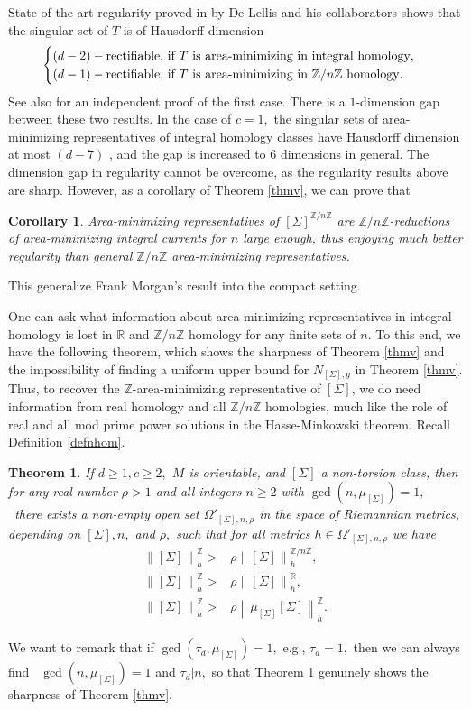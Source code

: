 \documentclass[11pt,a4paper]{amsart}
\numberwithin{equation}{section}
\newcommand{\Om}{\Omega}
\newcommand{\Si}{\Sigma}
\newcommand{\rh}{\rho}
\newcommand{\no}[1]{\left\lVert#1\right\rVert}
\newcommand{\R}{\mathbb{R}}
\newcommand{\Z}{\mathbb{Z}}
\theoremstyle{plain}
\newtheorem{thm}{Theorem}
\newtheorem{cor}{Corollary}[subsection]
\theoremstyle{definition}
\numberwithin{equation}{subsection}
\begin{document}
	State of the art regularity proved in \cite{LScy,DMS1,DMS2,DMS3,DMSmodq} by De Lellis and his collaborators  shows that the singular set of $T$ is of Hausdorff dimension
	\begin{align*}
		\begin{cases}
			(d-2)-\textnormal{rectifiable, if }T\textnormal{ is area-minimizing in integral homology},\\
			(d-1)-\textnormal{rectifiable, if }T\textnormal{ is area-minimizing in }\Z/n\Z \textnormal{ homology}.
		\end{cases}
	\end{align*}See also \cite{BK1,BK2,BK3} for an independent proof of the first case.
	There is a $1$-dimension gap between these two results. In the case of $c=1,$ the singular sets of area-minimizing representatives of integral homology classes have Hausdorff dimension at most $(d-7)$ \cite{NV}, and the gap is increased to $6$ dimensions in general. The dimension gap in regularity cannot be overcome, as the regularity results above are sharp. However, as a corollary of Theorem \ref{thmv}, we can prove that
	\begin{cor}\label{coras}
		Area-minimizing representatives of $[\Si]^{\Z/n\Z}$ are $\Z/n\Z$-reductions of area-minimizing integral currents for $n$ large enough, thus enjoying much better regularity than general $\Z/n\Z$ area-minimizing representatives.
	\end{cor}
This  generalize Frank Morgan's result \cite{FMmmn} into the compact setting. 

	One can ask what information about area-minimizing representatives in integral homology is lost in $\R$ and $\Z/n\Z$ homology for any finite sets of $n$. To this end, we have the following theorem, which shows the sharpness of Theorem \ref{thmv} and the impossibility of finding a uniform upper bound for $N_{[\Si],g}$ in Theorem \ref{thmv}. Thus, to recover the $\Z$-area-minimizing representative of $[\Si]$, we do need information from real homology and all $\Z/n\Z$ homologies, much like the role of real and all mod prime power solutions in the Hasse-Minkowski theorem. Recall Definition \ref{defnhom}.
	\begin{thm}\label{thmvn}
		If $d\ge 1,c\ge 2,$ $M$ is orientable, and $[\Si]$ a non-torsion class, then for any real number $\rh>1$ and all integers $n\ge 2$ with $\operatorname{gcd}\left(n,\mu_{[\Si]}\right)=1,$  there exists a non-empty open set $\Om'_{[\Si],n,\rh}$ in the space of Riemannian metrics, depending on $[\Si],n,$ and $\rh,$ such that for all metrics $h\in\Om'_{[\Si],n,\rh}$ we have
		\begin{align}
			\label{eqzv}	{\no{[\Si]}^{\Z}_h}>& \rh{\no{[\Si]}^{\Z/n\Z}_h},\\
			\label{eqzr}	{\no{[\Si]}^{\Z}_h}>&\rh{\no{[\Si]}^{\R}_h},\\
			\label{eqzz}	{\no{[\Si]}^{\Z}_h}>& \rh{\no{\mu_{[\Si]}[\Si]}^{\Z}_h}.
		\end{align}
	\end{thm}
	We want to remark that if $\operatorname{gcd}(\tau_d,\mu_{[\Si]})=1,$ e.g., $\tau_d=1,$ then we can always find  $\operatorname{gcd}\left(n,\mu_{[\Si]}\right)=1$ and $\tau_d|n,$ so that Theorem \ref{thmvn} genuinely shows the sharpness of Theorem \ref{thmv}. 
	
\end{document}
